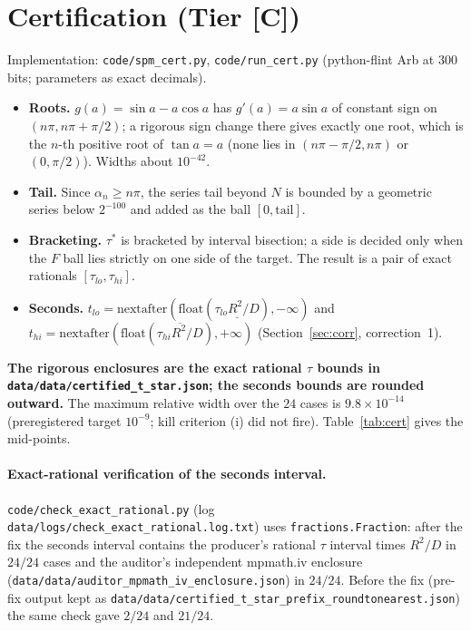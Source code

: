 \documentclass[10pt]{article}
\newcommand{\tier}[1]{\textsf{[#1]}}
\newcommand{\tC}{\tier{C}}
\begin{document}
\section{Certification (Tier \tC{})}\label{sec:cert}
Implementation: \texttt{code/spm\_cert.py}, \texttt{code/run\_cert.py} (python-flint Arb at $300$ bits; parameters as exact decimals).
\begin{itemize}\itemsep=1pt
\item \textbf{Roots.} $g(a)=\sin a-a\cos a$ has $g'(a)=a\sin a$ of constant sign on $(n\pi,n\pi+\pi/2)$; a rigorous sign change there gives exactly one root, which is the $n$-th positive root of $\tan a=a$ (none lies in $(n\pi-\pi/2,n\pi)$ or $(0,\pi/2)$). Widths about $10^{-42}$.
\item \textbf{Tail.} Since $\alpha_n\ge n\pi$, the series tail beyond $N$ is bounded by a geometric series below $2^{-100}$ and added as the ball $[0,\text{tail}]$.
\item \textbf{Bracketing.} $\tau^*$ is bracketed by interval bisection; a side is decided only when the $F$ ball lies strictly on one side of the target. The result is a pair of exact rationals $[\tau_{lo},\tau_{hi}]$.
\item \textbf{Seconds.} $t_{lo}=\mathrm{nextafter}(\mathrm{float}(\underline{\tau_{lo}R^2/D}),-\infty)$ and $t_{hi}=\mathrm{nextafter}(\mathrm{float}(\overline{\tau_{hi}R^2/D}),+\infty)$ (Section~\ref{sec:corr}, correction~1).
\end{itemize}
\textbf{The rigorous enclosures are the exact rational $\tau$ bounds in \texttt{data/data/certified\_t\_star.json}; the seconds bounds are rounded outward.} The maximum relative width over the $24$ cases is $9.8\times10^{-14}$ (preregistered target $10^{-9}$; kill criterion (i) did not fire). Table~\ref{tab:cert} gives the mid-points.

\begin{table}[h]\centering\small

\caption{All $24$ certified cases ($t^*$ mid-point of the outward-rounded seconds interval, $3$ decimals; full rational bounds in the JSON). The last column is the relative size of the exponential correction to the long-time formula (Section~\ref{sec:longtime}), recomputed with mpmath ($40$ digits).}\label{tab:cert}
\end{table}

\paragraph{Exact-rational verification of the seconds interval.} \texttt{code/check\_exact\_rational.py} (log \texttt{data/logs/check\_exact\_rational.log.txt}) uses \texttt{fractions.Fraction}: after the fix the seconds interval contains the producer's rational $\tau$ interval times $R^2/D$ in $24/24$ cases and the auditor's independent mpmath.iv enclosure (\texttt{data/data/auditor\_mpmath\_iv\_enclosure.json}) in $24/24$. Before the fix (pre-fix output kept as \texttt{data/data/certified\_t\_star\_prefix\_roundtonearest.json}) the same check gave $2/24$ and $21/24$.
\end{document}
